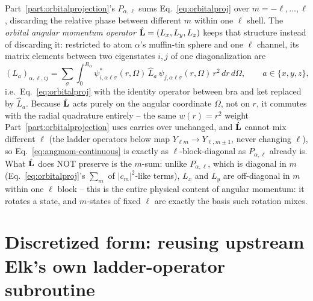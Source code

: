 \documentclass[11pt]{article}
\begin{document}
Part~\ref{part:orbitalprojection}'s $P_{\alpha,\ell}$ sums Eq.~\eqref{eq:orbitalproj} over
$m=-\ell,\dots,\ell$, discarding the relative phase between different $m$ within one
$\ell$ shell. The \emph{orbital angular momentum operator} $\hat{\bf L}=(L_x,L_y,L_z)$
keeps that structure instead of discarding it: restricted to atom $\alpha$'s muffin-tin
sphere and one $\ell$ channel, its matrix elements between two eigenstates $i,j$ of one
diagonalization are
\begin{equation}
  (L_a)_{\alpha,\ell,ij} = \sum_\sigma \int_0^{R_\alpha}
    \psi_{i,\alpha\ell\sigma}^*(r,\Omega)\,\hat L_a\,\psi_{j,\alpha\ell\sigma}(r,\Omega)\,
    r^2\,dr\,d\Omega,
  \qquad a\in\{x,y,z\},
  \label{eq:angmom-continuous}
\end{equation}
i.e.\ Eq.~\eqref{eq:orbitalproj} with the identity operator between bra and ket replaced
by $\hat L_a$. Because $\hat{\bf L}$ acts purely on the angular coordinate $\Omega$, not
on $r$, it commutes with the radial quadrature entirely -- the same $w(r)=r^2$ weight
Part~\ref{part:orbitalprojection} uses carries over unchanged, and $\hat{\bf L}$ cannot mix
different $\ell$ (the ladder operators below map $Y_{\ell m}\to Y_{\ell,m\pm1}$, never
changing $\ell$), so Eq.~\eqref{eq:angmom-continuous} is exactly as $\ell$-block-diagonal
as $P_{\alpha,\ell}$ already is. What $\hat{\bf L}$ does NOT preserve is the $m$-sum: unlike
$P_{\alpha,\ell}$, which is diagonal in $m$ (Eq.~\eqref{eq:orbitalproj}'s $\sum_m$ of
$|c_m|^2$-like terms), $L_x$ and $L_y$ are off-diagonal in $m$ within one $\ell$ block --
this is the entire physical content of angular momentum: it rotates a state, and $m$-states
of fixed $\ell$ are exactly the basis such rotation mixes.

\section{Discretized form: reusing upstream Elk's own ladder-operator subroutine}
\end{document}
